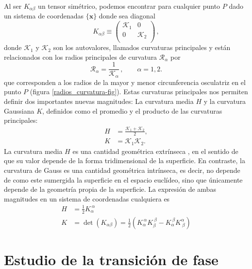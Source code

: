 Al ser $K_{\alpha\beta}$ un tensor simétrico, podemos encontrar para cualquier
punto $P$ dado un sistema de coordenadas $\{\mathbf{x}\}$ donde sea diagonal
\begin{equation*}
K_{\alpha\beta}\equiv\left(\begin{array}{cc}
\mathcal{K}_1 & 0\\
0 & \mathcal{K}_2\\
\end{array}\right)\, ,
\end{equation*} 
donde $\mathcal{K}_1$ y $\mathcal{K}_2$ son los autovalores, llamados
curvaturas principales y están relacionados con los radios principales
de curvatura $\mathcal{R}_{\alpha}$ por
\begin{equation*}
\mathcal{R}_{\alpha}=\frac{1}{\mathcal{K}_{\alpha}} \, , \qquad \alpha=1,2.
\end{equation*}
que corresponden a los radios de la mayor y menor circunferencia osculatriz en
el punto $P$ (figura \ref{radios_curvatura-fig}).
Estas curvaturas principales nos permiten definir dos importantes nuevas magnitudes:
La curvatura media $H$ y la curvatura Gaussiana $K$, definidos como el
promedio y el producto de las curvaturas principales:
\begin{align*}
H&=\frac{\mathcal{K}_1+\mathcal{K}_2}{2},\\
K&=\mathcal{K}_1\mathcal{K}_2.
\end{align*}
La curvatura media $H$ es una cantidad geométrica extrínseca \cite{LuisLinares}, en el sentido de
que su valor depende de la forma tridimensional de la superficie. En
contraste, la curvatura de Gauss es una cantidad geométrica intrínseca, es
decir, no depende de como este sumergida la superficie en el espacio euclídeo,
sino que únicamente depende de la geometría propia de la superficie. La
expresión de ambas magnitudes en un sistema de coordenadas cualquiera es
\begin{align}
H&= \frac{1}{2}K_{\alpha}^{\ \alpha}\label{curvatura_media}\\
K&= \det(K_{\alpha\beta})=\frac{1}{2}(K_{\alpha}^{\ \alpha}K_{\beta}^{\ \beta}-K_{\alpha}^{\ \beta}K^{\alpha}_{\ \beta})\label{curvatura_gaussiana}
\end{align}

\section{Estudio de la transición de fase}

